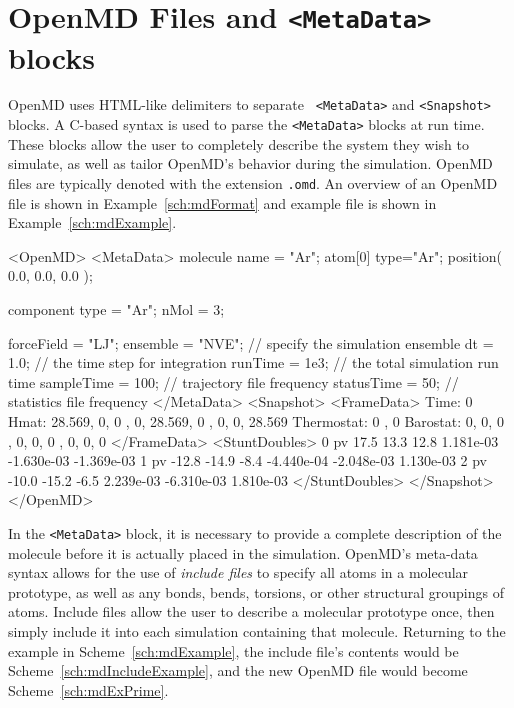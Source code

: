 \documentclass[letterpaper]{report}
\begin{document}
\section{OpenMD Files and {\tt <MetaData>} blocks}

OpenMD uses HTML-like delimiters to separate {\tt
  <MetaData>} and {\tt <Snapshot>} blocks.  A C-based syntax
is used to parse the {\tt <MetaData>} blocks at run time.  These
blocks allow the user to completely describe the system they wish to
simulate, as well as tailor OpenMD's behavior during the
simulation.  OpenMD files are typically denoted with the
extension {\tt .omd}. An overview of an OpenMD file is shown in
Example~\ref{sch:mdFormat} and example file is shown in
Example~\ref{sch:mdExample}.

\begin{code}[caption={[An example of a complete OpenMD
file] An example showing a complete OpenMD file.},
label={sch:mdExample}] 
<OpenMD>
  <MetaData>
molecule{
  name = "Ar";
  atom[0]{
    type="Ar";
    position( 0.0, 0.0, 0.0 );
  }
}

component{
  type = "Ar";
  nMol = 3;
}

forceField = "LJ";
ensemble = "NVE"; // specify the simulation ensemble
dt = 1.0;         // the time step for integration
runTime = 1e3;    // the total simulation run time
sampleTime = 100; // trajectory file frequency
statusTime = 50;  // statistics file frequency
  </MetaData>
  <Snapshot>
    <FrameData>
        Time: 0
        Hmat: {{ 28.569, 0, 0 }, { 0, 28.569, 0 }, { 0, 0, 28.569 }}
  Thermostat: 0 , 0
    Barostat: {{ 0, 0, 0 }, { 0, 0, 0 }, { 0, 0, 0 }}
    </FrameData>
    <StuntDoubles>
         0      pv   17.5  13.3 12.8  1.181e-03 -1.630e-03 -1.369e-03
         1      pv  -12.8 -14.9 -8.4 -4.440e-04 -2.048e-03  1.130e-03
         2      pv  -10.0 -15.2 -6.5  2.239e-03 -6.310e-03  1.810e-03
    </StuntDoubles>
  </Snapshot>
</OpenMD>
\end{code}

In the {\tt <MetaData>} block, it is necessary to provide a
complete description of the molecule before it is actually placed in
the simulation. OpenMD's meta-data syntax allows for the use of
{\it include files} to specify all atoms in a molecular prototype, as
well as any bonds, bends, torsions, or other structural groupings of
atoms.  Include files allow the user to describe a molecular prototype
once, then simply include it into each simulation containing that
molecule. Returning to the example in Scheme~\ref{sch:mdExample}, the
include file's contents would be Scheme~\ref{sch:mdIncludeExample},
and the new OpenMD file would become Scheme~\ref{sch:mdExPrime}.
\end{document}
